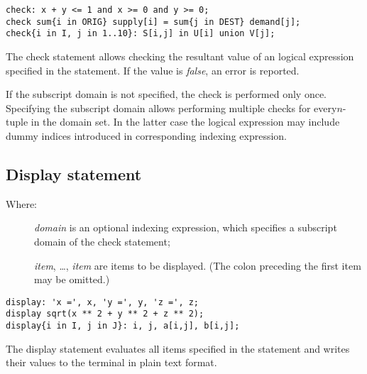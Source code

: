 \documentclass[10pt]{article}
\begin{document}

\begin{verbatim}
check: x + y <= 1 and x >= 0 and y >= 0;
check sum{i in ORIG} supply[i] = sum{j in DEST} demand[j];
check{i in I, j in 1..10}: S[i,j] in U[i] union V[j];
\end{verbatim}

The check statement allows checking the resultant value of an logical
expression specified in the statement. If the value is {\it false}, an
error is reported.

If the subscript domain is not specified, the check is performed only
once. Specifying the subscript domain allows performing multiple checks
for every\linebreak $n$-tuple in the domain set. In the latter case the
logical expression may include dummy indices introduced in
corresponding indexing expression.

\subsection{Display statement}

\medskip


\setlength{\leftmargini}{60pt}

\begin{description}
\item[{\rm Where:}\hspace*{23pt}] {\it domain} is an optional indexing
expression, which specifies a subscript domain of the check statement;
\item[\hspace*{54pt}] {\it item}, \dots, {\it item} are items to be
displayed. (The colon preceding the first item may be omitted.)
\end{description}


\begin{verbatim}
display: 'x =', x, 'y =', y, 'z =', z;
display sqrt(x ** 2 + y ** 2 + z ** 2);
display{i in I, j in J}: i, j, a[i,j], b[i,j];
\end{verbatim}

\newpage

The display statement evaluates all items specified in the statement
and writes their values to the terminal in plain text format.
\end{document}

